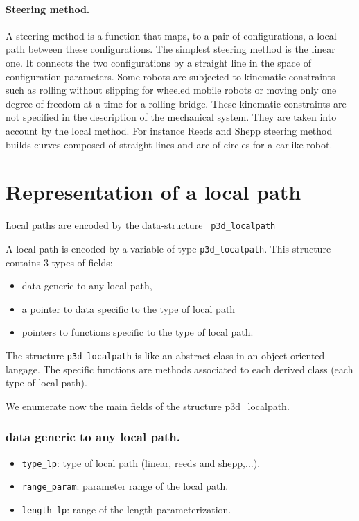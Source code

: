 \paragraph{Steering method.}
A steering method is a function that maps, to a pair of configurations, a
local path between these configurations. The simplest steering method is the 
linear one. It connects the two configurations by a  straight line in the
space of configuration parameters.
Some robots are subjected to kinematic constraints such as rolling
without slipping for wheeled mobile robots or moving only one degree
of freedom at a time for a rolling bridge. These kinematic constraints
are not specified in the description of the mechanical system. They
are taken into account by the local method. For instance Reeds and Shepp 
steering method builds curves composed of straight lines and arc of circles
for a carlike robot.

\section{Representation of a local path}
\label{sec:representation}

Local paths are encoded by the data-structure {\tt
  p3d\_localpath}

A local path is encoded by a variable of type {\tt p3d\_localpath}. This
structure contains 3 types of fields:
\begin{itemize}
\item data generic to any local path,
\item a pointer to data specific to the type of local path
\item pointers to functions specific to the type of local path.
\end{itemize}

The structure {\tt p3d\_localpath} is like an abstract class in an
object-oriented langage. The specific functions are methods associated
to each derived class (each type of local path).

We enumerate now the main fields of the structure {p3d\_localpath}.

\subsubsection*{data generic to any local path.}
\begin{itemize}
\item {\tt type\_lp}: type of local path (linear, reeds and shepp,...).
\item {\tt range\_param}: parameter range of the local path.
\item {\tt length\_lp}: range of the length parameterization.
\end{itemize}

